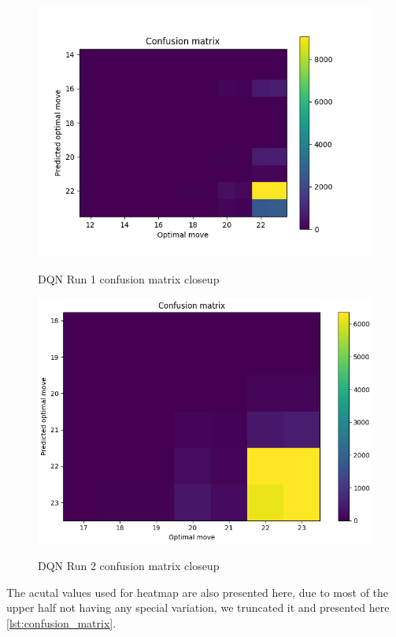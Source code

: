 \begin{figure}
\centering
\includegraphics[scale=1]{cm2.png}\\
\caption{DQN Run 1 confusion matrix closeup}
\label{fig:dqn_r1_2}
\end{figure}

\begin{figure}
\centering
\includegraphics[scale=0.6]{cm4.png}\\
\caption{DQN Run 2 confusion matrix closeup}
\label{fig:dqn_r2_2}
\end{figure}

The acutal values used for heatmap are also presented here, due to most of the upper half not having any special variation, we truncated it and presented here \ref{lst:confusion_matrix}.

